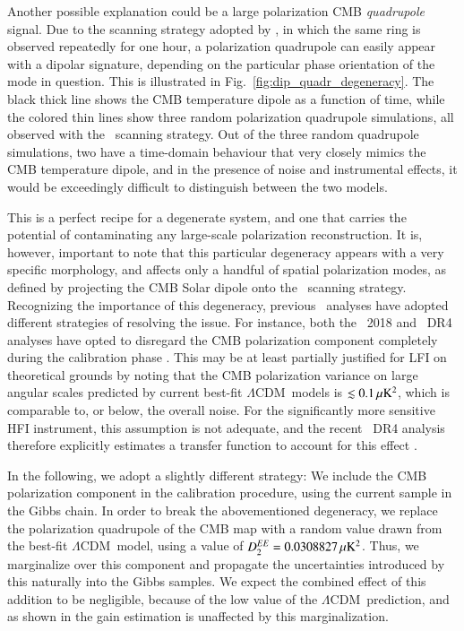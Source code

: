 \documentclass[twocolumn]{aa}
\def\LCDM{$\Lambda$CDM}
\begin{document}
Another possible explanation could be a large polarization
CMB \emph{quadrupole} signal. Due to the scanning strategy adopted by
\Planck, in which the same ring is observed repeatedly for one hour, a
polarization quadrupole can easily appear with a dipolar signature,
depending on the particular phase orientation of the mode in
question. This is illustrated in
Fig.~\ref{fig:dip_quadr_degeneracy}. The black thick line shows the
CMB temperature dipole as a function of time, while the colored thin
lines show three random polarization quadrupole simulations, all
observed with the \Planck\ scanning strategy. Out of the three random
quadrupole simulations, two have a time-domain behaviour that
very closely mimics the CMB temperature dipole, and in the presence of
noise and instrumental effects, it would be exceedingly difficult
to distinguish between the two models.

This is a perfect recipe for a degenerate system, and one
that carries the potential of contaminating any large-scale
polarization reconstruction. It is, however, important to note that
this particular degeneracy appears with a very specific morphology,
and affects only a handful of spatial polarization modes, as defined
by projecting the CMB Solar dipole onto the \Planck\ scanning
strategy. Recognizing the importance of this degeneracy, previous
\Planck\ analyses have adopted different strategies of resolving the
issue. For instance, both the \Planck\ 2018 and \Planck\ DR4 analyses
have opted to disregard the CMB polarization component completely
during the calibration phase
\citep{planck2014-a03,planck2016-l02,planck2020-LVII}. This may be at least
partially justified for LFI on theoretical grounds by noting that the
CMB polarization variance on large angular scales predicted by current
best-fit \LCDM\ models is $\lesssim0.1\muK^2$, which is comparable to,
or below, the overall noise. For the significantly more sensitive HFI
instrument, this assumption is not adequate, and the recent
\Planck\ DR4 analysis therefore explicitly estimates a transfer function to
account for this effect \citep{planck2020-LVII}.

In the following, we adopt a slightly different strategy: We include the CMB polarization component in the calibration procedure, using the current sample in the Gibbs chain. In order to break the abovementioned degeneracy, we replace the polarization quadrupole of the CMB map with a random value drawn from the best-fit \LCDM\ model, using a value of $D_2^{EE} = 0.0308827 \muK^2$. Thus, we marginalize over this component and propagate the uncertainties introduced by this naturally into the Gibbs samples. We expect the combined effect of this addition to be negligible, because of the low value of the \LCDM\ prediction, and as shown in \cite{bp04} the gain estimation is unaffected by this marginalization.
\end{document}
